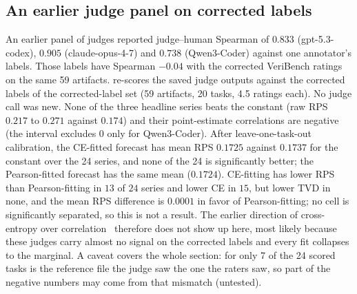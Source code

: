 \subsection{An earlier judge panel on corrected labels}
\label{sec:cert}
An earlier panel of judges reported judge--human Spearman of $0.833$ (gpt-5.3-codex), $0.905$ (claude-opus-4-7) and $0.738$ (Qwen3-Coder) against one annotator's labels.
Those labels have Spearman $-0.04$ with the corrected VeriBench ratings on the same 59 artifacts.
 re-scores the saved judge outputs against the corrected labels of the corrected-label set (59 artifacts, 20 tasks, 4.5 ratings each).
No judge call was new.
None of the three headline series beats the constant (raw RPS $0.217$ to $0.271$ against $0.174$) and their point-estimate correlations are negative (the interval excludes $0$ only for Qwen3-Coder).
After leave-one-task-out calibration, the CE-fitted forecast has mean RPS $0.1725$ against $0.1737$ for the constant over the 24 series, and none of the 24 is significantly better; the Pearson-fitted forecast has the same mean ($0.1724$).
CE-fitting has lower RPS than Pearson-fitting in $13$ of $24$ series and lower CE in $15$, but lower TVD in none, and the mean RPS difference is $0.0001$ in favor of Pearson-fitting; no cell is significantly separated, so this is not a result.
The earlier direction of cross-entropy over correlation~\citep{anon2026corrce} therefore does not show up here, most likely because these judges carry almost no signal on the corrected labels and every fit collapses to the marginal.
A caveat covers the whole section: for only 7 of the 24 scored tasks is the reference file the judge saw the one the raters saw, so part of the negative numbers may come from that mismatch (untested).

\begin{table}[t]
\caption{Headline judge series (prompt P8\_STRICT\_B) against the corrected labels, and the constant forecast (training marginal, leave-one-task-out). Task-cluster bootstrap 95\% intervals ($2{,}000$ draws). RPS, CE and TVD first.}
\label{tab:cert}
\centering\footnotesize\setlength{\tabcolsep}{3pt}
\end{table}

